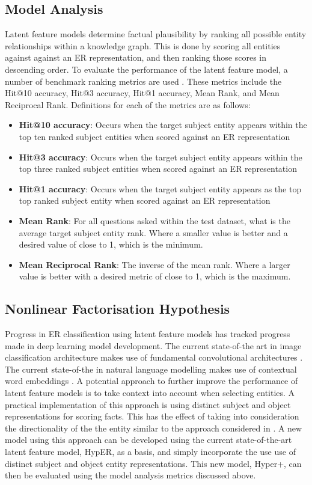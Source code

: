 \subsection{Model Analysis}
Latent feature models determine factual plausibility by ranking all possible entity relationships within a knowledge graph. This is done by scoring all entities against against an ER representation, and then ranking those scores in descending order. To evaluate the performance of the latent feature model, a number of benchmark ranking metrics are used \cite{reference}. These metrics include the Hit@10 accuracy, Hit@3 accuracy, Hit@1 accuracy, Mean Rank, and Mean Reciprocal Rank. Definitions for each of the metrics are as follows:
\begin{itemize}
	\item \textbf{Hit@10 accuracy}: Occurs when the target subject entity appears within the top ten ranked subject entities when scored against an ER representation
	\item \textbf{Hit@3 accuracy}: Occurs when the target subject entity appears within the top three ranked subject entities when scored against an ER representation
	\item \textbf{Hit@1 accuracy}: Occurs when the target subject entity appears as the top top ranked subject entity when scored against an ER representation
	\item \textbf{Mean Rank}: For all questions asked within the test dataset, what is the average target subject entity rank. Where a smaller value is better and a desired value of close to 1, which is the minimum.
	\item \textbf{Mean Reciprocal Rank}: The inverse of the mean rank. Where a larger value is better with a desired metric of close to 1, which is the maximum.
\end{itemize}

\subsection{Nonlinear Factorisation Hypothesis}
Progress in ER classification using latent feature models has tracked progress made in deep learning model development. The current state-of-the art in image classification architecture makes use of fundamental convolutional architectures \cite{reference}. The current state-of-the in natural language modelling makes use of contextual word embeddings \cite{reference}. A potential approach to further improve the performance of latent feature models is to take context into account when selecting entities. A practical implementation of this approach is using distinct subject and object representations for scoring facts. This has the effect of taking into consideration the directionality of the the entity similar to the approach considered in \cite{Deep Knowledge Models}. A new model using this approach can be developed using the current state-of-the-art latent feature model, HypER, as a basis, and simply incorporate the use use of distinct subject and object entity representations. This new model, Hyper+, can then be evaluated using the model analysis metrics discussed above. 

